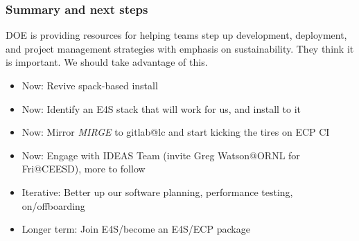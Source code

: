 \begin{frame}\frametitle{Summary and next steps}
DOE is providing resources for helping teams step up development, deployment, and project management strategies with emphasis on sustainability. They think it is important. We should take advantage of this.
\begin{itemize}
\item Now: Revive spack-based install
\item Now: Identify an E4S stack that will work for us, and install to it
\item Now: Mirror \textit{MIRGE} to gitlab@lc and start kicking the tires on ECP CI
\item Now: Engage with IDEAS Team (invite Greg Watson@ORNL for Fri@CEESD), more to follow
\item Iterative: Better up our software planning, performance testing, on/offboarding
\item Longer term: Join E4S/become an E4S/ECP package
\end{itemize}
\end{frame}

